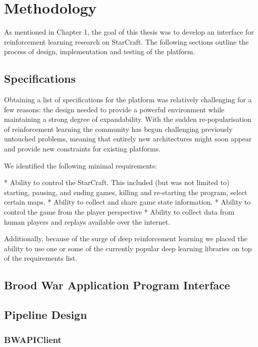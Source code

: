 \chapter{Methodology}

As mentioned in Chapter 1, the goal of this thesis was to develop an interface
for reinforcement learning research on StarCraft. The following sections
outline the process of design, implementation and testing of the platform.

\section{Specifications}

Obtaining a list of specifications for the platform was relatively challenging
for a few reasons: the design needed to provide a powerful environment while
maintaining a strong degree of expandability. With the sudden re-popularisation
of reinforcement learning the community has begun challenging previously
untouched problems, meaning that entirely new architectures might soon appear
and provide new constraints for existing platforms.

We identified the following minimal requirements:

* Ability to control the StarCraft. This included (but was not limited to) starting, pausing, and ending
games, killing and re-starting the program, select certain maps.
* Ability to collect and share game state information.
* Ability to control the game from the player perspective
* Ability to collect data from human players and replays available over the internet. 

Additionally, because of the surge of deep reinforcement learning we placed the
ability to use one or some of the currently popular deep learning libraries on
top of the requirements list.


\section{Brood War Application Program Interface}


\section{Pipeline Design} %

\subsection{BWAPIClient}

